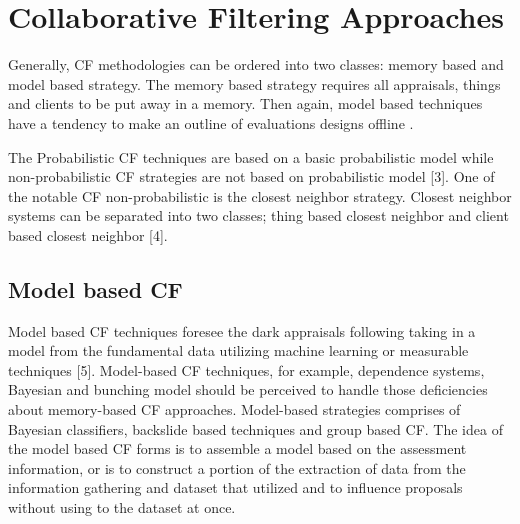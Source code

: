 \documentclass[10pt,conference]{IEEEtran}
\begin{document}
\section{Collaborative Filtering Approaches}
Generally, CF methodologies can be ordered into two classes: memory based and model based strategy. The memory based strategy requires all appraisals, things and clients to be put away in a memory. Then again, model based techniques have a tendency to make an outline of evaluations designs offline \cite{sarwar2001item}.

The Probabilistic CF techniques are based on a basic probabilistic model while non-probabilistic CF strategies are not based on probabilistic model [3]. One of the notable CF non-probabilistic is the closest neighbor strategy. Closest neighbor systems can be separated into two classes; thing based closest neighbor and client based closest neighbor [4]. 

\subsection{Model based CF}
Model based CF techniques foresee the dark appraisals following taking in a model from the fundamental data utilizing machine learning or measurable techniques [5]. Model-based
CF techniques, for example, dependence systems, Bayesian and bunching model should be perceived to handle those deficiencies about memory-based CF approaches. Model-based strategies comprises of Bayesian classifiers, backslide based techniques and group based CF. The idea of the model based CF forms is to assemble a model based on the assessment information, or is to construct a portion of the extraction of data from the information gathering and dataset that utilized and to influence proposals without using to the dataset at once. 
\end{document}
